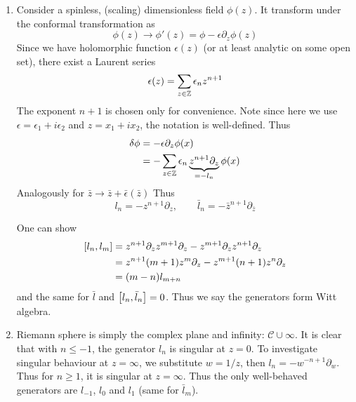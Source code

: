 \begin{enumerate}[label=(\alph*)]
	\item Consider a spinless, (scaling) dimensionless field $\phi(z)$. It transform under the conformal transformation as
		\begin{equation*}
			\phi(z) \rightarrow \phi'(z)  = \phi - \epsilon \partial_z \phi(z)
		\end{equation*}
		Since we have holomorphic function $\epsilon(z)$ (or at least analytic on some open set), there exist a Laurent series
		\begin{equation*}
			\epsilon(z) = \sum_{z \in \mathbb{Z}} \epsilon_n z^{n+1}
		\end{equation*}
		The exponent $n+1$ is chosen only for convenience. 
		Note since here we use $\epsilon = \epsilon_1 + i \epsilon_2$ and $z = x_1 + ix_2$, the notation is well-defined. Thus
		\begin{align*}
			\delta \phi &= - \epsilon \partial_z \phi(x) \\
							&= - \sum_{z\in \mathbb{Z}} \epsilon_n \underbrace{ z^{n+1} \partial_z}_{=-l_n} \phi(x)
		\end{align*}
		Analogously for $\bar{z} \rightarrow \bar{z} + \bar{\epsilon}(\bar{z})$
		Thus
		\begin{equation}
			l_n = - z^{n+1} \partial_z, \qquad \bar{l}_n = - \bar{z}^{n+1} \partial_{\bar{z}}	
		\end{equation}

		One can show
		\begin{align*}
			\comm{l_n}{l_m} &= z^{n+1} \partial_z z^{m+1} \partial_z - z^{m+1} \partial_z z^{n+1} \partial_z \\
								 &= z^{n+1} (m+1) z^{m} \partial_z - z^{m+1} (n+1) z^{n} \partial_z \\
								 &= (m-n) l_{m+n}
		\end{align*}
		and the same for $\bar{l}$ and $\comm{l_{n}}{\bar{l}_n} = 0$. Thus we say the generators form Witt algebra.

	\item Riemann sphere is simply the complex plane and infinity: $\mathcal{C} \cup \infty$. It is clear that with $n\leq -1$, the generator $l_n$ is singular at $z=0$. To investigate singular behaviour at $z=\infty$, we substitute $w = 1/z$, then $l_n = -w^{-n+1} \partial_w$. Thus for $n \geq 1$, it is singular at $z=\infty$. Thus the only well-behaved generators are $l_{-1}$, $l_0$ and $l_1$ (same for $\bar{l}_m$).


\end{enumerate}
